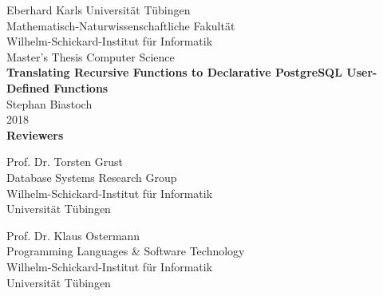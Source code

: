 \documentclass[oneside,12pt,a4paper]{report}
\begin{document}
\newcommand{\highlight}[2][yellow]{\mathchoice%
  {\colorbox{#1}{$\displaystyle#2$}}%
  {\colorbox{#1}{$\textstyle#2$}}%
  {\colorbox{#1}{$\scriptstyle#2$}}%
  {\colorbox{#1}{$\scriptscriptstyle#2$}}}%


 
\begin{titlepage}
 \begin{center}
  {\LARGE Eberhard Karls Universität Tübingen}\\
  {\large Mathematisch-Naturwissenschaftliche Fakultät \\
Wilhelm-Schickard-Institut für Informatik\\[4cm]}
  {\huge Master's Thesis Computer Science\\[2cm]}
  {\Large\bf Translating Recursive Functions to Declarative PostgreSQL User-Defined Functions\\[1.5cm]}
 {\large Stephan Biastoch}\\[0.5cm]
2018\\[3cm]
{\small\bf Reviewers}\\[0.5cm]
  \parbox{7cm}{\begin{center}{\large Prof. Dr. Torsten Grust}\\
  {\footnotesize Database Systems Research Group\\ Wilhelm-Schickard-Institut für Informatik\\%
	Universität Tübingen}\end{center}}\hfill\parbox{7cm}{\begin{center}
  {\large Prof. Dr. Klaus Ostermann}\\
  {\footnotesize Programming Languages \& Software Technology \\ Wilhelm-Schickard-Institut für Informatik\\%
	Universität Tübingen}\end{center}
 }
	

  \end{center}
\end{titlepage}
\end{document}
